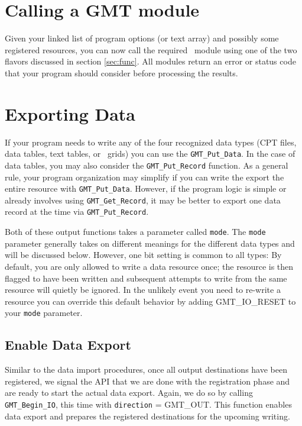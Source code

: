 \documentclass{report}
\begin{document}
\section{Calling a GMT module}

Given your linked list of program options (or text array) and possibly some registered resources, you
can now call the required \GMT\ module using one of the two flavors discussed in section {\ref{sec:func}}.
All modules return an error or status code that your program should consider before processing the results.

\section{Exporting Data}

If your program needs to write any of the four recognized data types (CPT files, data tables, text tables, or \GMT\ grids)
you can use the \texttt{GMT\_Put\_Data}. In the case of data tables, you may also consider the
\texttt{GMT\_Put\_Record} function.
As a general rule, your program organization may simplify if you can write the export the entire resource with
\texttt{GMT\_Put\_Data}.  However, if the program logic is simple or already involves using \texttt{GMT\_Get\_Record},
it may be better to export one data record at the time via \texttt{GMT\_Put\_Record}.


Both of these output functions takes a parameter called \texttt{mode}.  The \texttt{mode} parameter generally
takes on different meanings for the different data types and will be discussed below.
However, one bit setting is common to all types: By default, you are only allowed to write a
data resource once; the resource is then flagged to have been written and subsequent attempts to write
from the same resource will quietly be ignored.  In the unlikely event you need to re-write a
resource you can override this default behavior by adding GMT\_IO\_RESET to your \texttt{mode} parameter.

\subsection{Enable Data Export}

Similar to the data import procedures, once all output destinations have been registered, we signal the API that we are done with the registration
phase and are ready to start the actual data export.  Again, we do so by calling \texttt{GMT\_Begin\_IO}, this time with \texttt{direction} = GMT\_OUT.
This function enables data export and prepares the registered destinations for the upcoming writing.  
\end{document}
